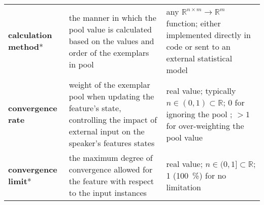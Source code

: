 {\begin{landscape}
\begin{table}[t]
\begin{tabulary}{\linewidth}{lLL}
				{\color{RoyalBlue}\textbf{calculation method}}*
				& the manner in which the pool value is calculated based on the values and order of the exemplars in pool
				& any $\mathbb{R}^{n \times m} \longrightarrow \mathbb{R}^{m}$ function; either implemented directly in code or sent to an external statistical model\\\addlinespace[0.2cm]
				
				{\color{RoyalBlue}\textbf{convergence rate}}
				& weight of the exemplar pool when updating the feature's state, controlling the impact of external input on the speaker's features states
				& real value; typically $n \in (0, 1) \subset \mathbb{R}$; 0 for ignoring the pool ; $> 1$ for over-weighting the pool value\\\addlinespace[0.2cm]
				
				{\color{red}\textbf{convergence limit}}*
				& the maximum degree of convergence allowed for the feature with respect to the input instances
				& real value; $n \in (0, 1] \subset \mathbb{R}$; 1 (\SI{100}{\percent}) for no limitation \\
				\bottomrule
			\end{tabulary}
		\end{table}
	\end{landscape}
}


